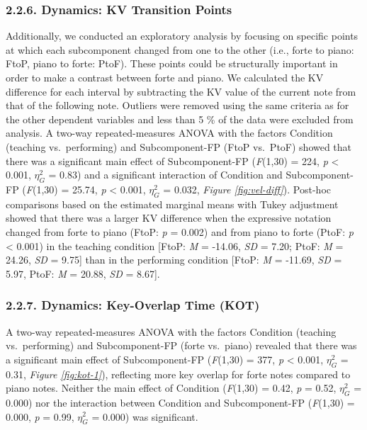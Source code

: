 \documentclass[
  english,
  man,floatsintext]{apa6}
\begin{document}
\hypertarget{dynamics-kv-transition-points}{%
\subsubsection{2.2.6. Dynamics: KV Transition Points}\label{dynamics-kv-transition-points}}

Additionally, we conducted an exploratory analysis by focusing on specific points at which each subcomponent changed from one to the other (i.e., forte to piano: FtoP, piano to forte: PtoF). These points could be structurally important in order to make a contrast between forte and piano. We calculated the KV difference for each interval by subtracting the KV value of the current note from that of the following note. Outliers were removed using the same criteria as for the other dependent variables and less than 5 \% of the data were excluded from analysis. A two-way repeated-measures ANOVA with the factors Condition (teaching vs.~performing) and Subcomponent-FP (FtoP vs.~PtoF) showed that there was a significant main effect of Subcomponent-FP (\emph{F}(1,30) = 224, \emph{p} \textless{} 0.001, \(\eta_G^2\) = 0.83) and a significant interaction of Condition and Subcomponent-FP (\emph{F}(1,30) = 25.74, \emph{p} \textless{} 0.001, \(\eta_G^2\) = 0.032, \emph{Figure \ref{fig:vel-diff}}). Post-hoc comparisons based on the estimated marginal means with Tukey adjustment showed that there was a larger KV difference when the expressive notation changed from forte to piano (FtoP: \emph{p} = 0.002) and from piano to forte (PtoF: \emph{p} \textless{} 0.001) in the teaching condition {[}FtoP: \emph{M} = -14.06, \emph{SD} = 7.20; PtoF: \emph{M} = 24.26, \emph{SD} = 9.75{]} than in the performing condition {[}FtoP: \emph{M} = -11.69, \emph{SD} = 5.97, PtoF: \emph{M} = 20.88, \emph{SD} = 8.67{]}.

\hypertarget{dynamics-key-overlap-time-kot}{%
\subsubsection{2.2.7. Dynamics: Key-Overlap Time (KOT)}\label{dynamics-key-overlap-time-kot}}

A two-way repeated-measures ANOVA with the factors Condition (teaching vs.~performing) and Subcomponent-FP (forte vs.~piano) revealed that there was a significant main effect of Subcomponent-FP (\emph{F}(1,30) = 377, \emph{p} \textless{} 0.001, \(\eta_G^2\) = 0.31, \emph{Figure \ref{fig:kot-1}}), reflecting more key overlap for forte notes compared to piano notes. Neither the main effect of Condition (\emph{F}(1,30) = 0.42, \emph{p} = 0.52, \(\eta_G^2\) = 0.000) nor the interaction between Condition and Subcomponent-FP (\emph{F}(1,30) = 0.000, \emph{p} = 0.99, \(\eta_G^2\) = 0.000) was significant.
\end{document}
